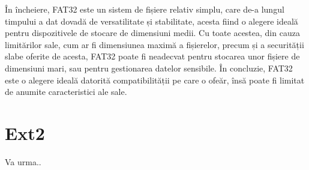 În încheiere, FAT32 este un sistem de fișiere relativ simplu, care de-a lungul timpului a dat dovadă de versatilitate și stabilitate, acesta fiind o alegere ideală pentru dispozitivele de stocare de dimensiuni medii. Cu toate acestea, din cauza limitărilor sale, cum ar fi dimensiunea maximă a fișierelor, precum și a securității slabe oferite de acesta, FAT32 poate fi neadecvat pentru stocarea unor fișiere de dimensiuni mari, sau pentru gestionarea datelor sensibile. În concluzie, FAT32 este o alegere ideală datorită compatibilității pe care o ofeăr, însă poate fi limitat de anumite caracteristici ale sale.




















\newpage

\section{Ext2}

Va urma..